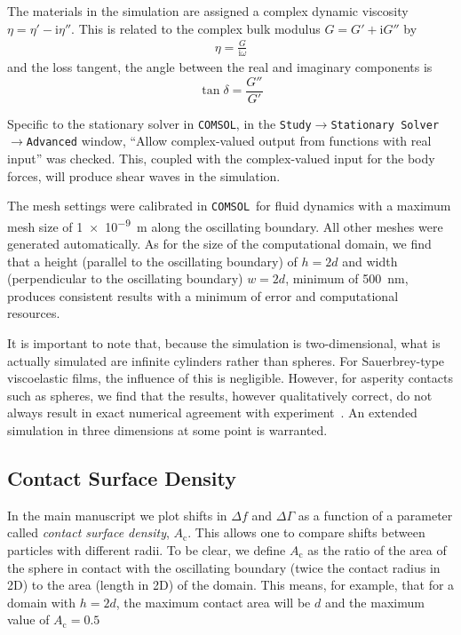 \documentclass[floatfix,superscriptaddress,a4paper,notitlepage]{revtex4-1}
\newcommand{\mi}{{\mathrm{i}}}
\newcommand{\comsol}{\texttt{COMSOL}}
\newcommand{\df}{\Delta\!f}
\newcommand{\dg}{\Delta\Gamma}
\newcommand{\Ac}{A_\mathrm{c}}
\begin{document}
The materials in the simulation are assigned a complex dynamic viscosity
$\eta = \eta'-\mi\eta''$.  This is related to the complex bulk modulus
$G=G'+\mi G''$ by
\begin{align}
  \eta = \frac{G}{\mi \omega}
\end{align}
and the loss tangent, the angle between the real and imaginary components
is
\begin{equation}
  \tan \delta = \frac{G''}{G'}
\end{equation}

Specific to the stationary solver in \comsol, in the
\texttt{Study$\rightarrow$Stationary Solver$\rightarrow$Advanced} window,
``Allow complex-valued output from functions with real input'' was checked.
This, coupled with the complex-valued input for the body forces, will
produce shear waves in the simulation.

The mesh settings were calibrated in \comsol~for fluid dynamics with a
maximum mesh size of \SI{1e-9}{\meter} along the oscillating boundary.  All
other meshes were generated automatically.  As for the size of the
computational domain, we find that a height (parallel to the oscillating
boundary) of $h=2d$ and width (perpendicular to the oscillating boundary)
$w=2d$, minimum of \SI{500}{\nano\meter}, produces consistent results with a
minimum of error and computational resources.

It is important to note that, because the simulation is two-dimensional,
what is actually simulated are infinite cylinders rather than spheres.  For
Sauerbrey-type viscoelastic films, the influence of this is negligible.
However, for asperity contacts such as spheres, we find that the results,
however qualitatively correct, do not always result in exact numerical
agreement with experiment~\cite{Vittorias2010489}.  An extended simulation
in three dimensions at some point is warranted.

\subsection{Contact Surface Density}

In the main manuscript we plot shifts in $\df$ and $\dg$ as a function of a
parameter called \textit{contact surface density}, $\Ac$.  This allows one
to compare shifts between particles with different radii.  To be clear, we
define $\Ac$ as the ratio of the area of the sphere in contact with the
oscillating boundary (twice the contact radius in 2D) to the area (length
in 2D) of the domain.  This means, for example, that for a domain with
$h=2d$, the maximum contact area will be $d$ and the maximum value of
$\Ac=0.5$
\end{document}
